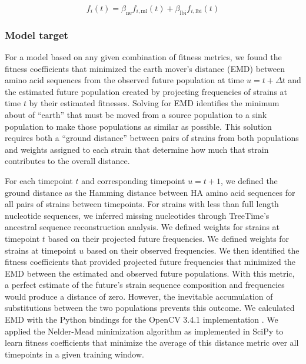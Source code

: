 \begin{equation}
    f_{i}(t) = \beta_{\mathrm{ne}}f_{i, \mathrm{ml}}(t) + \beta_{\mathrm{lbi}}f_{i, \mathrm{lbi}}(t)
    \label{equation_fitness_estimation}
\end{equation}

\subsubsection{Model target}

For a model based on any given combination of fitness metrics, we found the fitness coefficients that minimized the earth mover's distance (EMD) \citep{Rubner1998,Kusner2015} between amino acid sequences from the observed future population at time $u = t + \Delta{t}$ and the estimated future population created by projecting frequencies of strains at time $t$ by their estimated fitnesses.
Solving for EMD identifies the minimum about of ``earth'' that must be moved from a source population to a sink population to make those populations as similar as possible.
This solution requires both a ``ground distance'' between pairs of strains from both populations and weights assigned to each strain that determine how much that strain contributes to the overall distance.

For each timepoint $t$ and corresponding timepoint $u = t + 1$, we defined the ground distance as the Hamming distance between HA amino acid sequences for all pairs of strains between timepoints.
For strains with less than full length nucleotide sequences, we inferred missing nucleotides through TreeTime's ancestral sequence reconstruction analysis.
We defined weights for strains at timepoint $t$ based on their projected future frequencies.
We defined weights for strains at timepoint $u$ based on their observed frequencies.
We then identified the fitness coefficients that provided projected future frequencies that minimized the EMD between the estimated and observed future populations.
With this metric, a perfect estimate of the future's strain sequence composition and frequencies would produce a distance of zero.
However, the inevitable accumulation of substitutions between the two populations prevents this outcome.
We calculated EMD with the Python bindings for the OpenCV 3.4.1 implementation \citep{opencv_library}.
We applied the Nelder-Mead minimization algorithm as implemented in SciPy \citep{virtanen_scipy_2020} to learn fitness coefficients that minimize the average of this distance metric over all timepoints in a given training window.

